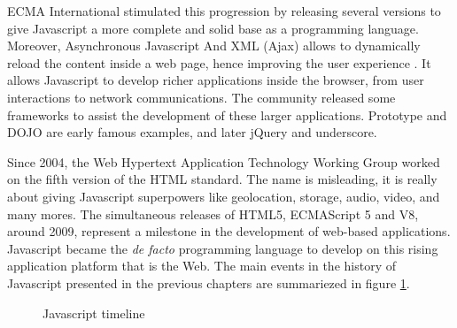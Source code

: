 ECMA International stimulated this progression by releasing several versions to give Javascript a more complete and solid base as a programming language.
Moreover, %
Asynchronous Javascript And XML (Ajax) allows to dynamically reload the content inside a web page, hence improving the user experience \cite{Garrett2005}.
It allows Javascript to develop richer applications inside the browser, from user interactions to network communications.
The community released some frameworks to assist the development of these larger applications.
Prototype and DOJO are early famous examples, and later jQuery and underscore.


Since 2004, the Web Hypertext Application Technology Working Group worked on the fifth version of the HTML standard.
The name is misleading, it is really about giving Javascript superpowers like geolocation, storage, audio, video, and many mores.
The simultaneous releases of HTML5, ECMAScript 5 and V8, around 2009, represent a milestone in the development of web-based applications.
Javascript became the \textit{de facto} programming language to develop on this rising application platform that is the Web.
The main events in the history of Javascript presented in the previous chapters are summariezed in figure \ref{fig:js-timeline}.

\begin{figure}
  \caption{Javascript timeline}
  \label{fig:js-timeline}
\end{figure}


